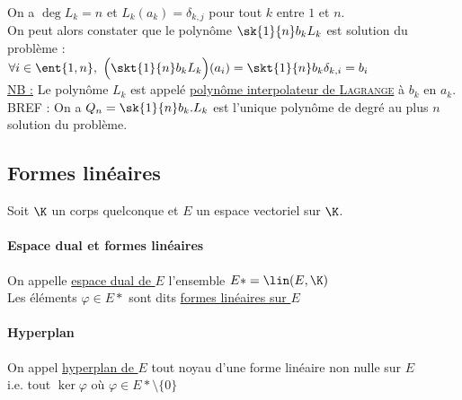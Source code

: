		On a $\deg L_k = n$ et $L_k(a_k) = \delta_{k,j}$ pour tout $k$ entre $1$ et $n$. \\
		On peut alors constater que le polynôme $\sk{1}{n} b_kL_k$ est solution du problème : \\
		$\forall i\in\ent{1,n} ,~ \Big(\skt{1}{n} b_k L_k \Big)(a_i) = \skt{1}{n} b_k \delta_{k,i} = b_i$ \vspace*{0.2cm} \\
		\uline{NB :} Le polynôme $L_k$ est appelé \uline{polynôme interpolateur de \textsc{Lagrange}} à $b_k$ en $a_k$.
		\vspace*{0.5cm} \\ \hspace*{0.5cm} BREF : On a $Q_n = \sk{1}{n} b_k.L_k$ est l'unique polynôme de degré au plus $n$ solution du problème.
		
	\subsection{Formes linéaires}
		Soit $\K$ un corps quelconque et $E$ un espace vectoriel sur $\K$.
		\traitd
		\paragraph{Espace dual et formes linéaires}
			On appelle \uline{espace dual de $E$} l'ensemble $E*=\lin (E,\K)$\\
			Les éléments $\varphi\in E*$ sont dits \uline{formes linéaires sur $E$}
		\trait
		\traitd
		\paragraph{Hyperplan}
			On appel \uline{hyperplan de $E$} tout noyau d'une forme linéaire non nulle sur $E$\\
			\hspace*{2.5cm} i.e. tout $\ker \varphi$ où $\varphi\in E*\setminus\{0\}$ \trait

